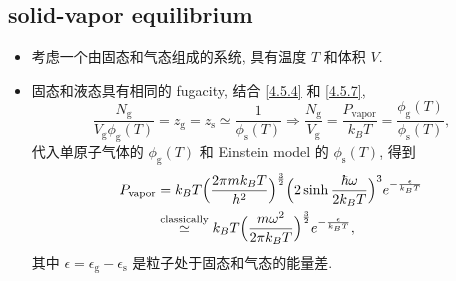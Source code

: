 \subsection{solid-vapor equilibrium}
\begin{itemize}
	\item 考虑一个由固态和气态组成的系统, 具有温度 $T$ 和体积 $V$.
	
	\item 固态和液态具有相同的 fugacity, 结合 \eqref{4.5.4} 和 \eqref{4.5.7},
	\begin{equation}
		\frac{N_\text{g}}{V_\text{g} \phi_\text{g}(T)} = z_\text{g} = z_\text{s} \simeq \frac{1}{\phi_\text{s}(T)} \Longrightarrow \frac{N_\text{g}}{V_\text{g}} = \frac{P_\text{vapor}}{k_B T} = \frac{\phi_\text{g}(T)}{\phi_\text{s}(T)},
	\end{equation}
	代入单原子气体的 $\phi_\text{g}(T)$ 和 Einstein model 的 $\phi_\text{s}(T)$, 得到
	\begin{align}
		P_\text{vapor} &= k_B T \Big( \frac{2 \pi m k_B T}{h^2} \Big)^{\frac{3}{2}} \Big( 2 \sinh \frac{\hbar \omega}{2 k_B T} \Big)^3 e^{- \frac{\epsilon}{k_B T}} \notag \\
		&\overset{\text{classically}}{\simeq} k_B T \Big( \frac{m \omega^2}{2 \pi k_B T} \Big)^{\frac{3}{2}} e^{- \frac{\epsilon}{k_B T}},
	\end{align}
	其中 $\epsilon = \epsilon_\text{g} - \epsilon_\text{s}$ 是粒子处于固态和气态的能量差.
\end{itemize}


